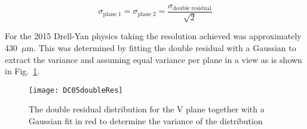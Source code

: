 \begin{equation}
\sigma_{\mathrm{plane \; 1}} = \sigma_{\mathrm{plane \; 2}} =
\frac{\sigma_{\mathrm{double \; residual}}}{\sqrt{2}}
\end{equation}

\noindent
For the 2015 Drell-Yan physics taking the resolution achieved was
approximately 430~$\mu$m. This was determined by fitting the double residual
with a Gaussian to extract the variance and assuming equal variance per plane in
a view as is shown in Fig.~\ref{fig::DC05doubleRes}.

\begin{figure}[h!t]
  \centering \texttt{[image: DC05doubleRes]}
  \caption{The double residual distribution for the V plane together with a
    Gaussian fit in red to determine the variance of the distribution}
  \label{fig::DC05doubleRes}
\end{figure}

